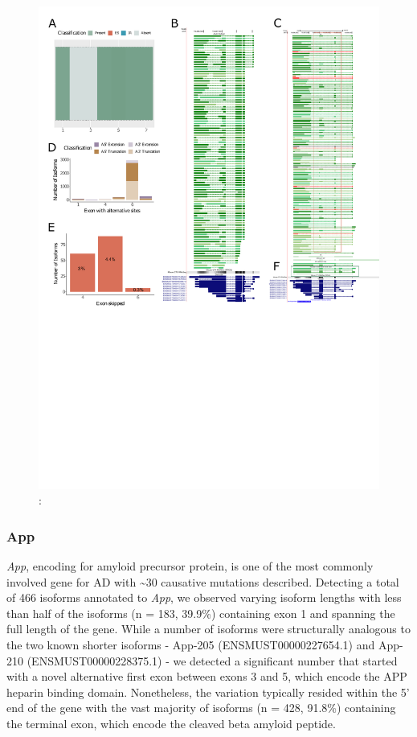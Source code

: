 \begin{figure}[htp]
	\begin{center}
		\includegraphics[page=3,trim={0 1cm 0 0},scale = 0.85]{Figures/TargetGenes_Annotation_Portrait.pdf}
	\end{center}
	\captionsetup{width=0.95\textwidth}
	\caption[RNA-Seq defined transcriptome]%
	{\textbf{}: }   
	\label{fig:bin1}
\end{figure}

\newpage
\subsubsection{App}
\textit{App}, encoding for amyloid precursor protein, is one of the most commonly involved gene for AD with \textasciitilde30 causative mutations described. Detecting a total of 466 isoforms annotated to \textit{App}, we observed varying isoform lengths with less than half of the isoforms (n = 183, 39.9\%) containing exon 1 and spanning the full length of the gene. While a number of isoforms were structurally analogous to the two known shorter isoforms - App-205 (ENSMUST00000227654.1) and App-210 (ENSMUST00000228375.1) - we detected a significant number that started with a novel alternative first exon between exons 3 and 5, which encode the APP heparin binding domain. Nonetheless, the variation typically resided within the 5' end of the gene with the vast majority of isoforms (n = 428, 91.8\%) containing the terminal exon, which encode the cleaved beta amyloid peptide. 

